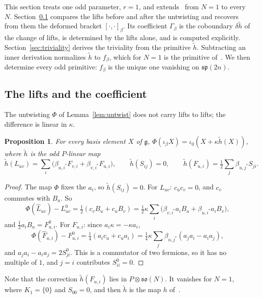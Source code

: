 \documentclass[11pt]{article}
\numberwithin{equation}{section}
\newtheorem{proposition}[theorem]{Proposition}
\theoremstyle{definition}
\theoremstyle{remark}
\begin{document}
This section treats one odd parameter, $r=1$, and extends~\cite{Aoi26} from $N=1$ to every
$N$. Section~\ref{sec:recovery} compares the lifts before and after the untwisting and
recovers from them the deformed bracket $[\cdot,\cdot]_\beta$. Its coefficient $\Gamma_\beta$ is the
coboundary $\delta\tilde h$ of the change of lifts, is determined by the lifts alone, and is computed
explicitly. Section~\ref{sec:triviality} derives the triviality from the primitive $\tilde h$.
Subtracting an inner derivation normalizes $\tilde h$ to $f_\beta$, which for $N=1$ is the primitive
of~\cite{Aoi26}. We then determine every odd primitive: $f_\beta$ is the unique one vanishing on
$\mathfrak{sp}(2n)$.

\subsection{The lifts and the coefficient}\label{sec:recovery}

The untwisting $\Phi$ of Lemma~\ref{lem:untwist} does not carry lifts to lifts; the difference
is linear in $\kappa$.

\begin{proposition}\label{prop:lift-change}
For every basis element $X$ of $\mathfrak g$, $\Phi(\iota_\beta X)=\iota_0(X+\kappa\tilde h(X))$, where $\tilde h$
is the odd $P$-linear map
\[
 \tilde h(L_{uv})=\sum_i\bigl(\beta_{u,i^*}F_{v,i}+\beta_{v,i^*}F_{u,i}\bigr),\qquad
 \tilde h(S_{ij})=0,\qquad
 \tilde h(F_{u,i})=\tfrac12\sum_j\beta_{u,j^*}S_{ji}.
\]
\end{proposition}

\begin{proof}
The map $\Phi$ fixes the $a_i$, so $\tilde h(S_{ij})=0$. For $L_{uv}$: $c_uc_v=0$, and $c_v$ commutes
with $B_u$. So
\[
 \Phi(\widehat L_{uv})-L^0_{uv}=\tfrac12(c_vB_u+c_uB_v)
 =\tfrac12\kappa\sum_i\bigl(\beta_{v,i^*}a_iB_u+\beta_{u,i^*}a_iB_v\bigr),
\]
and $\tfrac12a_iB_u=F^0_{u,i}$. For $F_{u,i}$: since
$a_i\kappa=-\kappa a_i$,
\[
 \Phi(\widehat F_{u,i})-F^0_{u,i}=\tfrac14(a_ic_u+c_ua_i)
 =\tfrac14\kappa\sum_j\beta_{u,j^*}(a_ja_i-a_ia_j),
\]
and $a_ja_i-a_ia_j=2S^0_{ji}$. This is a commutator of two fermions, so it has
no multiple of $1$, and $j=i$ contributes $S^0_{ii}=0$.
\end{proof}

Note that the correction $\tilde h(F_{u,i})$ lies in $P\otimes\mathfrak{so}(N)$. It vanishes for $N=1$,
where $K_1=\{0\}$ and $S_{00}=0$, and then $\tilde h$ is the map $h$ of~\cite[Section~3]{Aoi26}.
\end{document}
